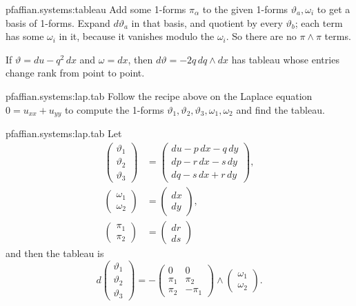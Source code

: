 \begin{answer}{pfaffian.systems:tableau}
Add some 1-forms \(\pi_{\alpha}\) to the given 1-forms \(\vartheta_a,\omega_i\) to get a basis of 1-forms.
Expand \(d\vartheta_a\) in that basis, and quotient by every \(\vartheta_b\); each term has some \(\omega_i\) in it, because it vanishes modulo the \(\omega_i\).
So there are no \(\pi \wedge \pi\) terms.
\end{answer}
\begin{example}
If \(\vartheta=du-q^2 \, dx\) and \(\omega=dx\), then \(d\vartheta = - 2q \, dq \wedge dx\) has tableau whose entries change rank from point to point.
\end{example}

\begin{problem}{pfaffian.systems:lap.tab}
Follow the recipe above on the Laplace equation \(0=u_{xx}+u_{yy}\) to compute the 1-forms \(\vartheta_1, \vartheta_2, \vartheta_3, \omega_1, \omega_2\) and find the tableau.
\end{problem}
\begin{answer}{pfaffian.systems:lap.tab}
Let 
\begin{align*}
\begin{pmatrix}
\vartheta_1 \\
\vartheta_2 \\
\vartheta_3
\end{pmatrix}
&=
\begin{pmatrix}
du-p \, dx-q \, dy \\
dp-r \, dx-s \, dy \\
dq-s \, dx+r \, dy
\end{pmatrix},
\\
\begin{pmatrix}
\omega_1 \\
\omega_2
\end{pmatrix}
&=
\begin{pmatrix}
dx \\
dy
\end{pmatrix},
\\
\begin{pmatrix}
\pi_1 \\
\pi_2
\end{pmatrix}
&=
\begin{pmatrix}
dr \\
ds
\end{pmatrix}
\end{align*}
and then the tableau is
\[
d
\begin{pmatrix}
\vartheta_1 \\
\vartheta_2 \\
\vartheta_3
\end{pmatrix}
=
-
\begin{pmatrix}
0 & 0 \\
\pi_1 & \pi_2 \\
\pi_2 & -\pi_1
\end{pmatrix}
\wedge
\begin{pmatrix}
\omega_1 \\
\omega_2
\end{pmatrix}.
\]
\end{answer}

